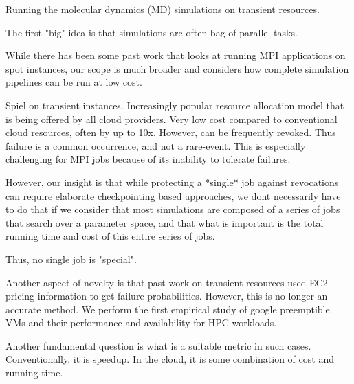 Running the molecular dynamics (MD) simulations on transient resources. 

The first "big" idea is that simulations are often bag of parallel tasks. 

While there has been some past work that looks at running MPI applications on spot instances, our scope is much broader and considers how complete simulation pipelines can be run at low cost. 

Spiel on transient instances. Increasingly popular resource allocation model that is being offered by all cloud providers. 
Very low cost compared to conventional cloud resources, often by up to 10x. 
However, can be frequently revoked. 
Thus failure is a common occurrence, and not a rare-event. 
This is especially challenging for MPI jobs because of its inability to tolerate failures. 

However, our insight is that while protecting a *single* job against revocations can require elaborate checkpointing based approaches, we dont necessarily have to do that if we consider that most simulations are composed of a series of jobs that search over a parameter space, and that what is important is the total running time and cost of this entire series of jobs. 

Thus, no single job is "special". 

Another aspect of novelty is that past work on transient resources used EC2 pricing information to get failure probabilities. However, this is no longer an accurate method. We perform the first empirical study of google preemptible VMs and their performance and availability for HPC workloads. 

Another fundamental question is what is a suitable metric in such cases. Conventionally, it is speedup. In the cloud, it is some combination of cost and running time. 

